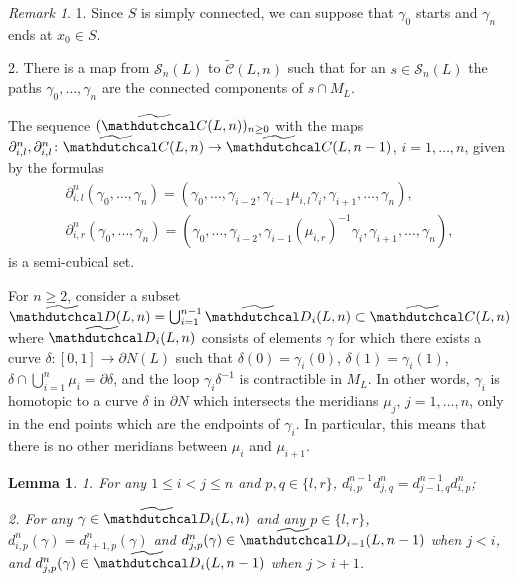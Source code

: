 \documentclass{article}
\newtheorem{lemma}{Lemma}
\theoremstyle{definition}
\theoremstyle{remark}
\newtheorem{remark}{Remark}
\begin{document}
\begin{remark}
    1. Since $S$ is simply connected, we can suppose that $\gamma_0$ starts and $\gamma_n$ ends at $x_0\in S$.

    2. There is a map from $\mathcal S_n(L)$ to $\widetilde{\mathcal C}(L,n)$ such that for an $s\in\mathcal S_n(L)$ the paths $\gamma_0,\dots, \gamma_n$ are the connected components of $s\cap M_L$.
\end{remark}

The sequence $(\widetilde{\mathdutchcal C}(L,n))_{n\ge 0}$ with the maps $\partial^n_{i,l},\partial^n_{i,l}\colon \widetilde{\mathdutchcal C}(L,n)\to\widetilde{\mathdutchcal C}(L,n-1)$, $i=1,\dots,n$, given by the formulas
\begin{gather*}
    \partial^n_{i,l}(\gamma_0,\dots,\gamma_n)=(\gamma_0,\dots,\gamma_{i-2},\gamma_{i-1}\mu_{i,l}\gamma_i,\gamma_{i+1},\dots,\gamma_n),\\
    \partial^n_{i,r}(\gamma_0,\dots,\gamma_n)=(\gamma_0,\dots,\gamma_{i-2},\gamma_{i-1}(\mu_{i,r})^{-1}\gamma_i,\gamma_{i+1},\dots,\gamma_n),
\end{gather*}
is a semi-cubical set.


For $n\ge 2$, consider a subset $\widetilde{\mathdutchcal D}(L,n)=\bigcup_{i=1}^{n-1}\widetilde{\mathdutchcal D}_i(L,n) \subset \widetilde{\mathdutchcal C}(L,n)$ where $\widetilde{\mathdutchcal D}_i(L,n)$ consists of elements $\gamma$ for which
there exists a curve $\delta\colon[0,1]\to\partial N(L)$ such that $\delta(0)=\gamma_i(0)$, $\delta(1)=\gamma_i(1)$, $\delta\cap\bigcup_{i=1}^n\mu_i=\partial\delta$, and the loop $\gamma_i\delta^{-1}$ is contractible in $M_L$. In other words, $\gamma_i$ is homotopic to a curve $\delta$ in $\partial N$ which intersects the meridians $\mu_j$, $j=1,\dots,n$, only in the end points which are the endpoints of $\gamma_i$. In particular, this means that there is no other meridians between $\mu_i$ and $\mu_{i+1}$.


\begin{lemma}
    1. For any $1\le i<j\le n$ and $p,q\in\{l,r\}$, $d^{n-1}_{i,p}d^n_{j,q}=d^{n-1}_{j-1,q}d^n_{i,p}$;

    2. For any $\gamma\in \widetilde{\mathdutchcal D}_i(L,n)$ and any $p\in\{l,r\}$, $d^n_{i,p}(\gamma)=d^n_{i+1,p}(\gamma)$ and $d^n_{j,p}(\gamma)\in\widetilde{\mathdutchcal D}_{i-1}(L,n-1)$ when $j<i$, and $d^n_{j,p}(\gamma)\in\widetilde{\mathdutchcal D}_{i}(L,n-1)$ when $j>i+1$.
\end{lemma}
\end{document}

